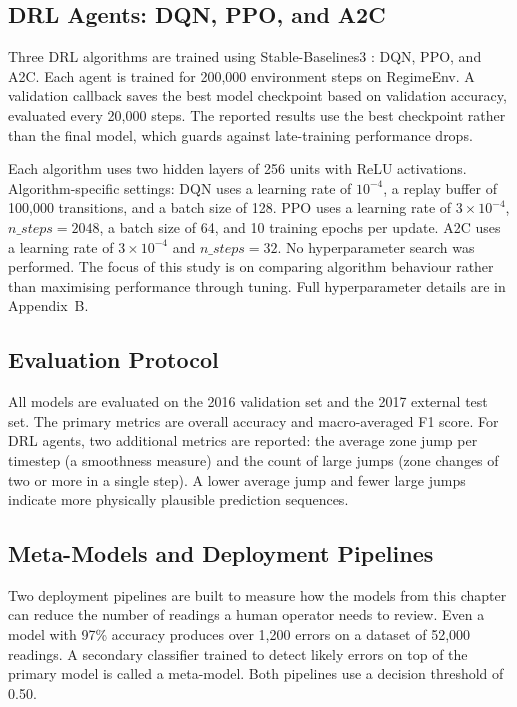 \subsection{DRL Agents: DQN, PPO, and A2C}
\label{subsec:ch4:agents}

Three DRL algorithms are trained using Stable-Baselines3 \citep{raffin2021}: DQN, PPO,
and A2C. Each agent is trained for 200,000 environment steps on RegimeEnv. A validation
callback saves the best model checkpoint based on validation accuracy, evaluated every
20,000 steps. The reported results use the best checkpoint rather than the final model,
which guards against late-training performance drops.

Each algorithm uses two hidden layers of 256 units with ReLU activations.
Algorithm-specific settings: DQN uses a learning rate of $10^{-4}$, a replay buffer
of 100,000 transitions, and a batch size of 128. PPO uses a learning rate of
$3 \times 10^{-4}$, $n\_steps = 2048$, a batch size of 64, and 10 training epochs per
update. A2C uses a learning rate of $3 \times 10^{-4}$ and $n\_steps = 32$. No
hyperparameter search was performed. The focus of this study is on comparing
algorithm behaviour rather than maximising performance through tuning. Full hyperparameter details
are in Appendix~B.

\subsection{Evaluation Protocol}
\label{subsec:ch4:evalprotocol}

All models are evaluated on the 2016 validation set and the 2017 external test set. The
primary metrics are overall accuracy and macro-averaged F1 score. For DRL agents, two
additional metrics are reported: the average zone jump per timestep (a smoothness
measure) and the count of large jumps (zone changes of two or more in a single step). A
lower average jump and fewer large jumps indicate more physically plausible prediction
sequences.

\subsection{Meta-Models and Deployment Pipelines}
\label{subsec:ch4:pipelines}

Two deployment pipelines are built to measure how the models from this chapter can reduce
the number of readings a human operator needs to review. Even a model with 97\% accuracy
produces over 1,200 errors on a dataset of 52,000 readings. A secondary classifier
trained to detect likely errors on top of the primary model is called a meta-model. Both
pipelines use a decision threshold of 0.50.

